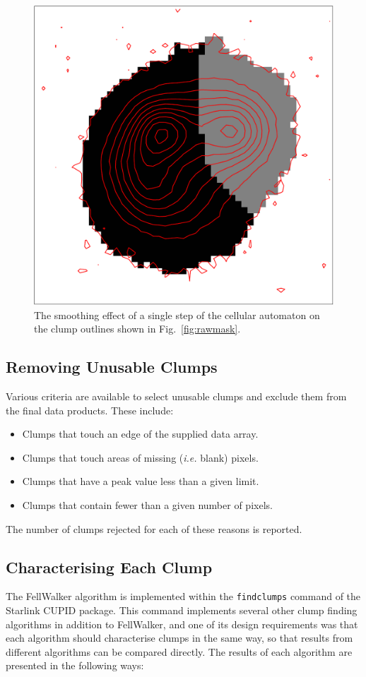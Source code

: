 \documentclass[final,authoryear,5p,times,twocolumn]{elsarticle}
\begin{document}
\begin{figure}
\includegraphics[width=\columnwidth]{cleaned}
\caption{The smoothing effect of a single step of the cellular automaton
on the clump outlines shown in Fig.~\ref{fig:rawmask}.}
\label{fig:cleanedmask}
\end{figure}

\subsection{Removing Unusable Clumps}
Various criteria are available to select unusable clumps and exclude them
from the final data products. These include:

\begin{itemize}
\item Clumps that touch an edge of the supplied data array.
\item Clumps that touch areas of missing (\emph{i.e.} blank) pixels.
\item Clumps that have a peak value less than a given limit.
\item Clumps that contain fewer than a given number of pixels.
\end{itemize}

The number of clumps rejected for each of these reasons is reported.

\subsection{Characterising Each Clump}
The FellWalker algorithm is implemented within the {\tt findclumps}
command of the Starlink CUPID package. This
command implements several other clump finding algorithms in addition to
FellWalker, and one of its design requirements was that each algorithm should characterise clumps in
the same way, so that results from different algorithms can be compared
directly. The results of each algorithm are presented in the following ways:
\end{document}
